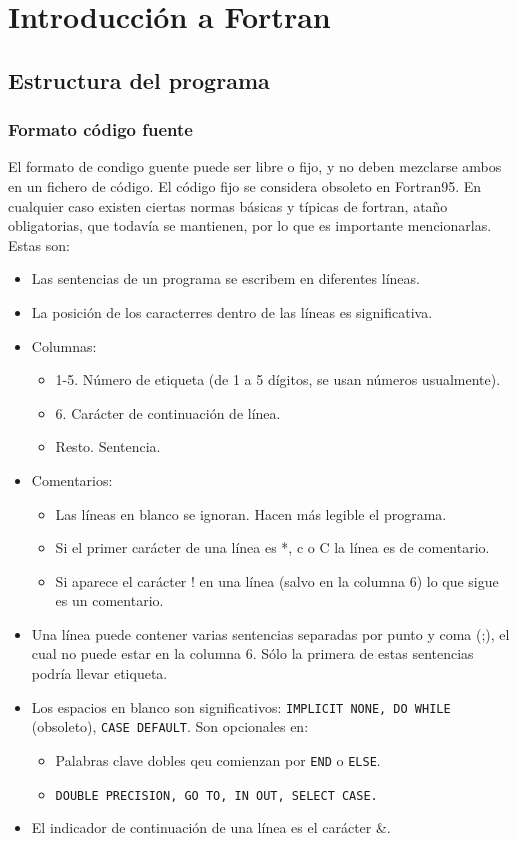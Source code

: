 \chapter{Introducción a Fortran}

\section{Estructura del programa}

\subsection{Formato código fuente}

El formato de condigo guente puede ser libre o fijo, y no deben mezclarse ambos en un fichero de código. El código fijo se considera obsoleto en Fortran95. En cualquier caso existen ciertas normas básicas y típicas de fortran, ataño obligatorias, que todavía se mantienen, por lo que es importante mencionarlas. Estas son:

\begin{itemize}
	\item Las sentencias de un programa se escribem en diferentes líneas.
	\item La posición de los caracterres dentro de las líneas es significativa.
	\item Columnas:
	      \begin{itemize}
		      \item 1-5. Número de etiqueta (de 1 a 5 dígitos, se usan números usualmente).
		      \item 6. Carácter de continuación de línea.
		      \item Resto. Sentencia.
	      \end{itemize}
	\item Comentarios:
	      \begin{itemize}
		      \item Las líneas en blanco se ignoran. Hacen más legible el programa.
		      \item Si el primer carácter de una línea es *, c o C la línea es de comentario.
		      \item Si aparece el carácter ! en una línea (salvo en la columna 6) lo que sigue es un comentario.
	      \end{itemize}
	\item Una línea puede contener varias sentencias separadas por punto y coma (;), el cual no puede estar en la columna 6. Sólo la primera de estas sentencias podría llevar etiqueta.
	\item Los espacios en blanco son significativos: {\tt IMPLICIT NONE, DO WHILE} (obsoleto), {\tt CASE DEFAULT}. Son opcionales en:
	      \begin{itemize}
		      \item Palabras clave dobles qeu comienzan por {\tt END} o {\tt ELSE}.
		      \item {\tt DOUBLE PRECISION, GO TO, IN OUT, SELECT CASE.}
	      \end{itemize}
	\item  El indicador de continuación de una línea es el carácter \&.
\end{itemize}

